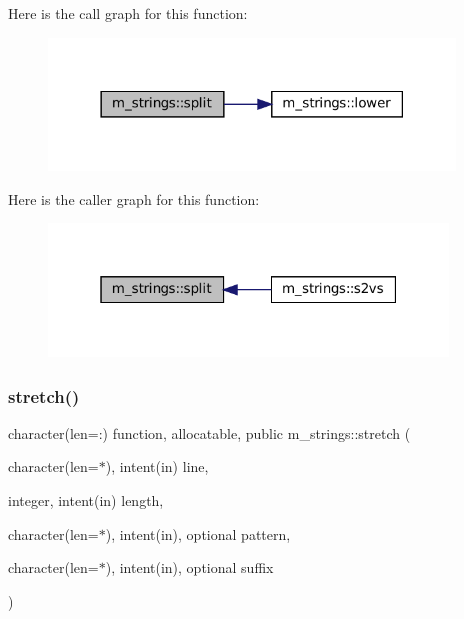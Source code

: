 Here is the call graph for this function\+:\nopagebreak
\begin{figure}[H]
\begin{center}
\leavevmode
\includegraphics[width=306pt]{namespacem__strings_a3f0119fab962146c7656cad592dd9acd_cgraph}
\end{center}
\end{figure}
Here is the caller graph for this function\+:\nopagebreak
\begin{figure}[H]
\begin{center}
\leavevmode
\includegraphics[width=301pt]{namespacem__strings_a3f0119fab962146c7656cad592dd9acd_icgraph}
\end{center}
\end{figure}
\mbox{\label{namespacem__strings_aa67b36ec70dbad84672d3069882929c5}} 
\subsubsection{\texorpdfstring{stretch()}{stretch()}}
{\footnotesize\ttfamily character(len=\+:) function, allocatable, public m\+\_\+strings\+::stretch (\begin{DoxyParamCaption}\item[{character(len=$\ast$), intent(in)}]{line,  }\item[{integer, intent(in)}]{length,  }\item[{character(len=$\ast$), intent(in), optional}]{pattern,  }\item[{character(len=$\ast$), intent(in), optional}]{suffix }\end{DoxyParamCaption})}



